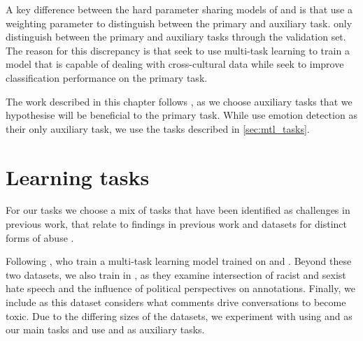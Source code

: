 A key difference between the hard parameter sharing models of \citet{Waseem:2018} and \citet{Rajamanickam:2020} is that \citet{Rajamanickam:2020} use a weighting parameter to distinguish between the primary and auxiliary task. \citet{Waseem:2018} only distinguish between the primary and auxiliary tasks through the validation set. The reason for this discrepancy is that \citet{Waseem:2018} seek to use multi-task learning to train a model that is capable of dealing with cross-cultural data while \citet{Rajamanickam:2020} seek to improve classification performance on the primary task. 

The work described in this chapter follows \citet{Rajamanickam:2020}, as we choose auxiliary tasks that we hypothesise will be beneficial to the primary task. While \citet{Rajamanickam:2020} use emotion detection as their only auxiliary task, we use the tasks described in \autoref{sec:mtl_tasks}.


\section{Learning tasks}\label{sec:mtl_tasks}

For our tasks we choose a mix of tasks that have been identified as challenges in previous work, that relate to findings in previous work \cite{Waseem-Hovy:2016,Davidson:2017,Schmidt:2017} and datasets for distinct forms of abuse \cite{Waseem:2016,Waseem-Hovy:2016,Davidson:2017,Wulczyn:2017}.

Following \citet{Waseem:2018}, who train a multi-task learning model trained on \citet{Waseem-Hovy:2016} and \citet{Davidson:2017}. Beyond these two datasets, we also train in \citet{Waseem:2016}, as they examine intersection of racist and sexist hate speech and the influence of political perspectives on annotations. Finally, we include \citet{Wulczyn:2017} as this dataset considers what comments drive conversations to become toxic. Due to the differing sizes of the datasets, we experiment with using \citet{Wulczyn:2017} and \citet{Davidson:2017} as our main tasks and use \citet{Waseem:2016} and \citet{Waseem-Hovy:2016} as auxiliary tasks.

